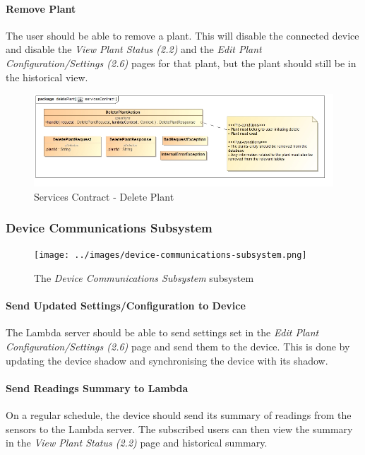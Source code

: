 \documentclass{article}
\let\cleardoublepage\clearpage
\begin{document}
			\paragraph{Remove Plant}
			The user should be able to remove a plant. This will disable the connected device and disable the \emph{View Plant Status (2.2)} and the \emph{Edit Plant Configuration/Settings (2.6)} pages for that plant, but the plant should still be in the historical view.
			\begin{figure}[H]
				\includegraphics[width=\linewidth]{../images/ServicesContracts/deletePlant.jpg}
				\caption{Services Contract - Delete Plant}
			\end{figure}
		
\cleardoublepage
		\subsubsection{Device Communications Subsystem}
		\begin{figure}[H]
			\centering
			\texttt{[image: ../images/device-communications-subsystem.png]}
			\caption{The \emph{Device Communications Subsystem} subsystem}
		\end{figure}
		\paragraph{Send Updated Settings/Configuration to Device}
			The Lambda server should be able to send settings set in the \emph{Edit Plant Configuration/Settings (2.6)} page and send them to the device. This is done by updating the device shadow and synchronising the device with its shadow.
		\paragraph{Send Readings Summary to Lambda}
			On a regular schedule, the device should send its summary of readings from the sensors to the Lambda server. The subscribed users can then view the summary in the \emph{View Plant Status (2.2)} page and historical summary.

\cleardoublepage		
	
\end{document}
